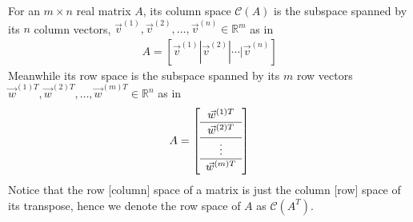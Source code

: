 \begin{defn}
\label{defn:colrowspace}
For an $m \times n$ real matrix $A$, its column space $\mathcal{C}(A)$ is the subspace spanned by its $n$ column vectors, $\vec{v}^{(1)}, \vec{v}^{(2)}, \ldots, \vec{v}^{(n)} \in \mathbb{R}^m$ as in 
\begin{align}
A = [\vec{v}^{(1)}|\vec{v}^{(2)}|\cdots|\vec{v}^{(n)}]    
\end{align}
Meanwhile its row space is the subspace spanned by its $m$ row vectors $\vec{w}^{(1)T}, \vec{w}^{(2)T}, \ldots, \vec{w}^{(m)T} \in \mathbb{R}^n$ as in
\begin{align}
A = 
\left[\begin{array}{c}
\vec{w}^{(1)T} \\
\hline
\vec{w}^{(2)T} \Tstrut\\
\hline
\vdots \\
\hline
\vec{w}^{(m)T} \Tstrut
\end{array}\right]
\end{align}
Notice that the row [column] space of a matrix is just the column [row] space of its transpose, hence we denote the row space of $A$ as $\mathcal{C}(A^T)$.
\end{defn}

